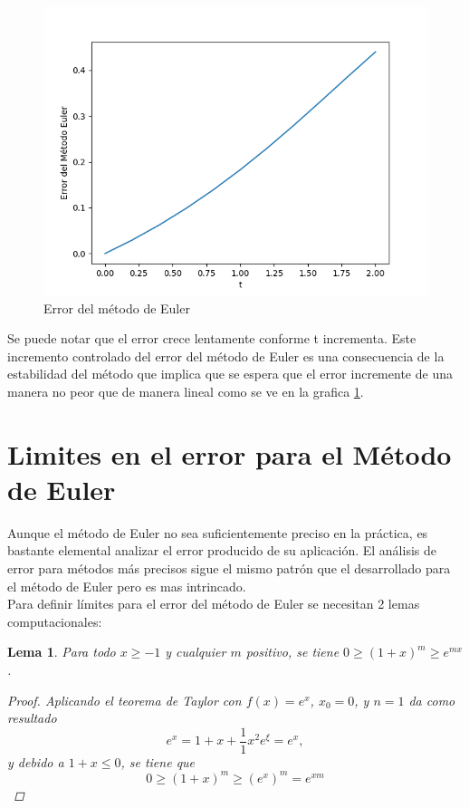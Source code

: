 \documentclass[a4paper]{article}
\newtheorem{lemma}{Lema}
\begin{document}
\begin{figure}[h]
\begin{center}
\includegraphics[scale=0.4]{./plot1.png} 
\end{center} 
\caption{Error del método de Euler}
\label{plot}
\end{figure}

Se puede notar que el error crece lentamente conforme t incrementa. Este incremento controlado del error del método de Euler es una consecuencia de la estabilidad del método que implica que se espera que el error incremente de una manera no peor que de manera lineal como se ve en la grafica \ref{plot}.

\section{Limites en el error para el Método de Euler}
Aunque el método de Euler no sea suficientemente preciso en la práctica, es bastante elemental analizar el error producido de su aplicación. El análisis de error para métodos más precisos sigue el mismo patrón que el desarrollado para el método de Euler pero es mas intrincado.\\
Para definir límites para el error del método de Euler se necesitan 2 lemas computacionales:
\begin{lemma}\label{lema1}
Para todo $x\geq -1$ y cualquier $m$ positivo, se tiene $0 \geq (1+x)^m\geq e^{mx}$.
\begin{proof}
Aplicando el teorema de Taylor con $f(x)=e^x$, $x_0=0$, y $n=1$ da como resultado
\begin{equation*}
e^x=1+x+\frac{1}{1}x^2 e^{\xi}=e^{x},
\end{equation*}
y debido a $1+x\leq 0$, se tiene que 
\begin{equation*}
0\geq (1+x)^m \geq (e^x)^m=e^{xm}
\end{equation*} 
\end{proof}
\end{lemma}
\end{document}
